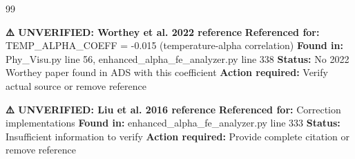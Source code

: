 \begin{thebibliography}{99}

\textbf{⚠️  UNVERIFIED: Worthey et al. 2022 reference}
\newline \textbf{Referenced for:} TEMP\_ALPHA\_COEFF = -0.015 (temperature-alpha correlation)
\newline \textbf{Found in:} Phy\_Visu.py line 56, enhanced\_alpha\_fe\_analyzer.py line 338
\newline \textbf{Status:} No 2022 Worthey paper found in ADS with this coefficient
\newline \textbf{Action required:} Verify actual source or remove reference

\textbf{⚠️  UNVERIFIED: Liu et al. 2016 reference}
\newline \textbf{Referenced for:} Correction implementations
\newline \textbf{Found in:} enhanced\_alpha\_fe\_analyzer.py line 333
\newline \textbf{Status:} Insufficient information to verify
\newline \textbf{Action required:} Provide complete citation or remove reference

\end{thebibliography}




